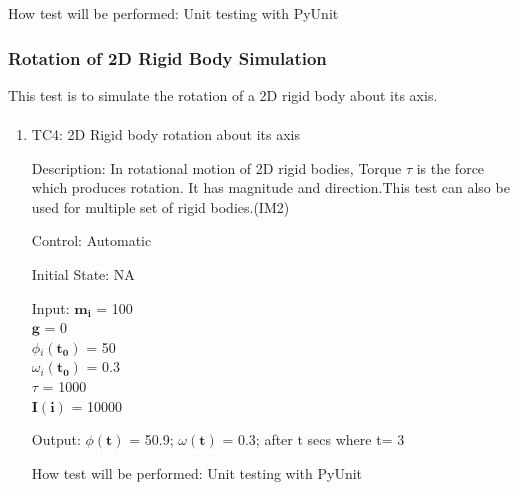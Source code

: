 \documentclass[12pt, titlepage]{article}
\begin{document}
\begin{enumerate}
How test will be performed: Unit testing with PyUnit

\end{enumerate}



\subsubsection{Rotation of 2D Rigid Body Simulation}
This test is to simulate the rotation of a 2D rigid body about its axis.
\paragraph{}
\begin{enumerate}
	
	\item{TC4: 2D Rigid body rotation about its axis\\}
	
	Description: In rotational motion of 2D rigid bodies, Torque $\tau$ is the force which produces rotation. It has magnitude and direction.This test can also be used for multiple set of rigid bodies.(IM2)
	
	Control: Automatic
	
	Initial State: NA
	
	Input: $\mathbf{m_i}$$\mathbf{}$ = 100\\
	\hspace*{1.3cm}$\mathbf{g}$$\mathbf{}$ = 0\\
	\hspace*{1.3cm}$\phi$$_i\mathbf{(t_0)}$ = 50\\
	\hspace*{1.3cm}$\omega$$_i\mathbf{(t_0)}$$ \mathbf{}$ = 0.3\\
	\hspace*{1.3cm}$\tau$$\mathbf{}$ = 1000 \\
	\hspace*{1.3cm}$\mathbf{I}$$\mathbf{(i)}$ = 10000
	
	Output:  $\phi$$\mathbf{(t)}$ = 50.9;
	$\omega$$\mathbf{(t)}$ = 0.3; after t secs where t= 3 
	
	How test will be performed: Unit testing with PyUnit

\end{enumerate}
\end{document}
